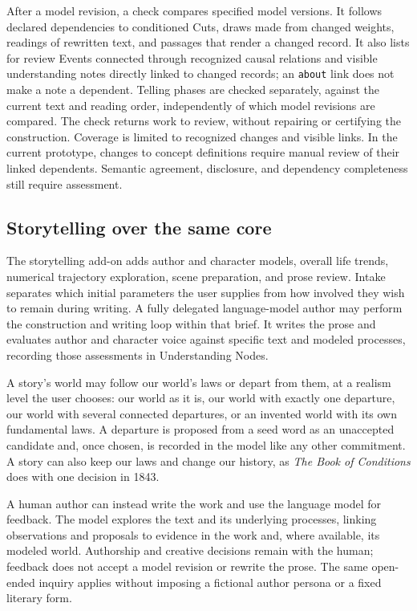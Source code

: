 \documentclass[11pt,a4paper]{article}
\begin{document}
After a model revision, a check compares specified model versions. It follows
declared dependencies to conditioned Cuts, draws made from changed weights,
readings of rewritten text, and passages that render a changed record. It also
lists for review Events connected through recognized causal relations and
visible understanding notes directly linked to changed records; an
\texttt{about} link does not make a note a dependent. Telling phases are
checked separately, against the current text and reading order, independently
of which model revisions are compared. The check returns work to review,
without repairing or certifying the construction. Coverage is limited to
recognized changes and visible links. In the current prototype, changes to
concept definitions require manual review of their linked dependents.
Semantic agreement, disclosure, and dependency completeness still require
assessment.

\subsection{Storytelling over the same core}
\label{sec:storytelling}

The storytelling add-on adds author and character models, overall life trends,
numerical trajectory exploration, scene preparation, and prose review. Intake
separates which initial parameters the user supplies from how involved they
wish to remain during writing. A fully delegated language-model author may
perform the construction and writing loop within that brief. It writes the
prose and evaluates author and character voice against
specific text and modeled processes, recording those assessments in
Understanding Nodes.

A story's world may follow our world's laws or depart from them, at a realism
level the user chooses: our world as it is, our world with exactly one
departure, our world with several connected departures, or an invented world
with its own fundamental laws. A departure is proposed from a seed word as an
unaccepted candidate and, once chosen, is recorded in the model like any other
commitment. A story can also keep our laws and change our history, as
\emph{The Book of Conditions} does with one decision in 1843.

A human author can instead write the work and use the language model for
feedback. The model explores the text and its underlying processes, linking
observations and proposals to evidence in the work and, where available, its
modeled world. Authorship and creative decisions remain with the human;
feedback does not accept a model revision or rewrite the prose. The same
open-ended inquiry applies without imposing a fictional author persona or a
fixed literary form.
\end{document}
